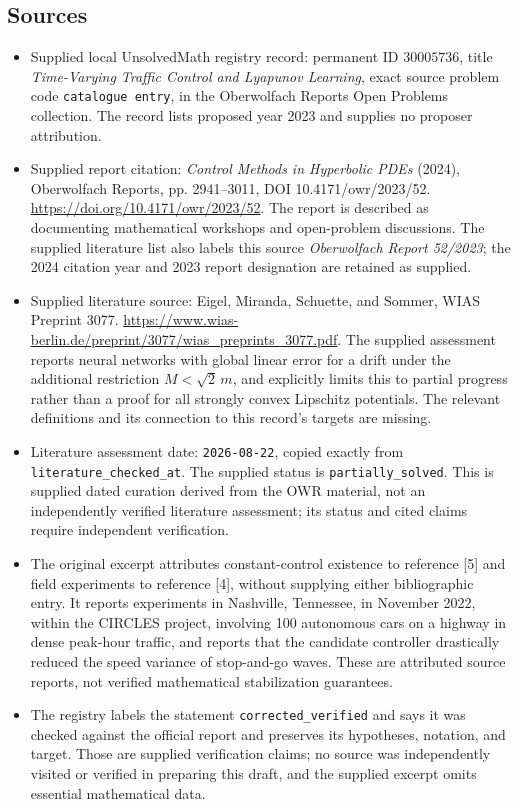\documentclass[11pt]{article}
\begin{document}
\subsection{Sources}
\begin{itemize}
\item Supplied local UnsolvedMath registry record: permanent ID \(30005736\), title \emph{Time-Varying Traffic Control and Lyapunov Learning}, exact source problem code \texttt{catalogue entry}, in the Oberwolfach Reports Open Problems collection. The record lists proposed year 2023 and supplies no proposer attribution.
\item Supplied report citation: \emph{Control Methods in Hyperbolic PDEs} (2024), Oberwolfach Reports, pp. 2941--3011, DOI 10.4171/owr/2023/52. \url{https://doi.org/10.4171/owr/2023/52}. The report is described as documenting mathematical workshops and open-problem discussions. The supplied literature list also labels this source \emph{Oberwolfach Report 52/2023}; the 2024 citation year and 2023 report designation are retained as supplied.
\item Supplied literature source: Eigel, Miranda, Schuette, and Sommer, WIAS Preprint 3077. \url{https://www.wias-berlin.de/preprint/3077/wias_preprints_3077.pdf}. The supplied assessment reports neural networks with global linear error for a drift under the additional restriction \(M<\sqrt{2}\,m\), and explicitly limits this to partial progress rather than a proof for all strongly convex Lipschitz potentials. The relevant definitions and its connection to this record's targets are missing.
\item Literature assessment date: \texttt{2026-08-22}, copied exactly from \texttt{literature\_checked\_at}. The supplied status is \texttt{partially\_solved}. This is supplied dated curation derived from the OWR material, not an independently verified literature assessment; its status and cited claims require independent verification.
\item The original excerpt attributes constant-control existence to reference [5] and field experiments to reference [4], without supplying either bibliographic entry. It reports experiments in Nashville, Tennessee, in November 2022, within the CIRCLES project, involving 100 autonomous cars on a highway in dense peak-hour traffic, and reports that the candidate controller drastically reduced the speed variance of stop-and-go waves. These are attributed source reports, not verified mathematical stabilization guarantees.
\item The registry labels the statement \texttt{corrected\_verified} and says it was checked against the official report and preserves its hypotheses, notation, and target. Those are supplied verification claims; no source was independently visited or verified in preparing this draft, and the supplied excerpt omits essential mathematical data.
\end{itemize}
\end{document}
